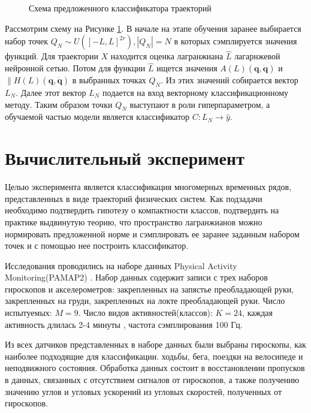 \documentclass[a4paper, 12pt]{article}
\begin{document}
\begin{figure}[!htbp]
\centering
{}
\caption{Схема предложенного классификатора траекторий}
\label{fig: classificator}
\end{figure}

Рассмотрим схему на Рисунке \ref{fig: classificator}. В начале на этапе обучения заранее выбирается набор точек $Q_N \sim U([-L, L]^{2r}), |Q_N| = N$ в которых сэмплируется значения функций. Для траектории $X$ находится оценка лагранжиана $\hat{L}$ лагарнжевой нейронной сетью. Потом для функции $\hat{L}$ ищется значения $A(L)\left(\mathbf{q}, \dot{\mathbf{q}}\right)$ и $\|H(L)\left(\mathbf{q}, \dot{\mathbf{q}}\right)$ в выбранных точках $Q_N$. Из этих значений собирается вектор $L_N$. Далее этот вектор $L_N$ подается на вход векторному классификационному методу. Таким образом точки  $Q_N$ выступают в роли гиперпараметром, а обучаемой частью модели является классификатор $C: L_N \to \hat{y}$.

\section{Вычислительный эксперимент}
 Целью эксперимента является классификация многомерных временных рядов, представленных в виде траекторий физических систем. Как подзадачи необходимо подтвердить гипотезу о компактности классов, подтвердить на практике выдвинутую теорию, что пространство лагранжианов можно нормировать предложенной норме и сэмплировать ее заранее заданным набором точек и с помощью нее построить классификатор.

    Исследования проводились на наборе данных Physical Activity Monitoring(PAMAP2) \cite{dataset}.
 Набор данных содержит записи с трех наборов гироскопов и акселерометров: закрепленных на запястье преобладающей руки, закрепленных на груди, закрепленных на локте преобладающей руки. Число испытуемых: $M = 9$. Число видов активностей(классов): $K = 24$, каждая активность длилась 2-4 минуты \cite{dataset}, частота сэмплирования 100 Гц.


 Из всех датчиков представленных в наборе данных были выбраны гироскопы, как наиболее подходящие для классификации. ходьбы, бега, поездки на велосипеде и неподвижного состояния. Обработка данных состоит в восстановлении пропусков в данных, связанных с отсутствием сигналов от гироскопов, а также получению значению углов и угловых ускорений из угловых скоростей, полученных от гироскопов.
 
\end{document}
